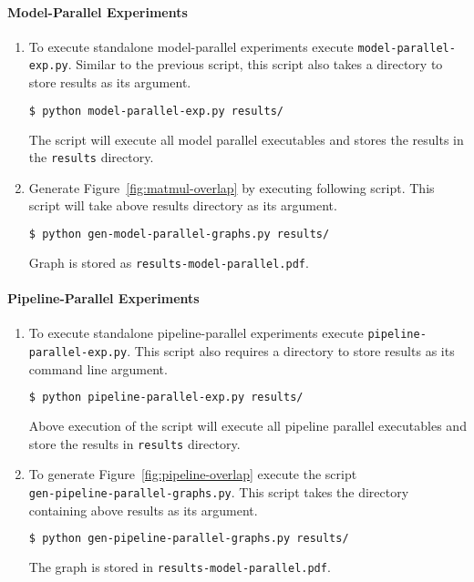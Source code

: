 \paragraph{Model-Parallel Experiments}
\begin{enumerate}
  \item To execute standalone model-parallel experiments execute \texttt{model-parallel-exp.py}. Similar to the previous script, this script also takes a directory to store results as its argument.
  
  {\footnotesize
\begin{lstlisting}[language=bash]
$ python model-parallel-exp.py results/
\end{lstlisting}
}

  The script will execute all model parallel executables and stores the results in the \texttt{results} directory.
  \item Generate Figure~\ref{fig:matmul-overlap} by executing following script. This script will take above results directory as its argument. 
  
{\footnotesize
\begin{lstlisting}[language=bash]
$ python gen-model-parallel-graphs.py results/
\end{lstlisting}
}

Graph is stored as \texttt{results-model-parallel.pdf}.
\end{enumerate}

\paragraph{Pipeline-Parallel Experiments}
\begin{enumerate}
  \item To execute standalone pipeline-parallel experiments execute \texttt{pipeline-parallel-exp.py}. This script also requires a directory to store results as its command line argument.

  {\footnotesize
\begin{lstlisting}[language=bash]
$ python pipeline-parallel-exp.py results/
\end{lstlisting}
}

  Above execution of the script will execute all pipeline parallel executables and store the results in \texttt{results} directory.
  \item To generate Figure~\ref{fig:pipeline-overlap} execute the script \\ \texttt{gen-pipeline-parallel-graphs.py}. This script takes the directory containing above results as its argument.
  
{\footnotesize
\begin{lstlisting}[language=bash]
$ python gen-pipeline-parallel-graphs.py results/
\end{lstlisting}
}

The graph is stored in \texttt{results-model-parallel.pdf}.
\end{enumerate}

